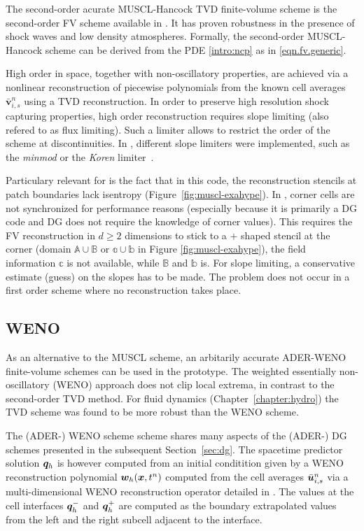 The second-order acurate MUSCL-Hancock TVD finite-volume scheme
\citep{toro-book} is the second-order FV scheme available in
. It has proven robustness in the presence of
shock waves and low density atmospheres. 
Formally, the second-order MUSCL-Hancock scheme can be derived from the PDE
\eqref{intro:ncp} as in \eqref{eqn.fv.generic}.

High order in space, together with non-oscillatory properties, are
achieved  via a {nonlinear} reconstruction of
piecewise polynomials from the known cell averages
$\bar{\boldsymbol{v}}_{i,s}^n$ using a TVD reconstruction. In order to
preserve high resolution shock capturing properties, high order
reconstruction requires slope limiting (also refered to as flux limiting).
Such a limiter allows to restrict the order of the scheme at discontinuities.
In , different slope limiters were implemented, such as the
\emph{minmod} \cite{Roe86} or the \emph{Koren} limiter~\cite{Koren1993}.

Particulary relevant for  is the fact that in this code,
the reconstruction stencils at patch boundaries lack isentropy
(Figure~\ref{fig:muscl-exahype}).
In , corner cells are not synchronized for performance reasons
(especially because it is primarily a DG code and DG does not require
the knowledge of corner values). This requires the FV reconstruction in
$d\geq 2$ dimensions to stick to a $+$ shaped stencil at the corner
(domain $\mathbb A \cup \mathbb B$ or $\mathbb a \cup \mathbb b$ in Figure
\ref{fig:muscl-exahype}), \ie the field information $\mathbb c$ is not
available, while $\mathbb B$ and $\mathbb b$ is.
For slope limiting, a conservative estimate (guess) on the slopes has to be
made.
The problem does not occur in a first order scheme where no
reconstruction takes place.

\subsection{WENO}

As an alternative to the MUSCL scheme, an arbitarily accurate ADER-WENO
finite-volume schemes can be used in the  prototype.
The weighted essentially non-oscillatory (WENO) approach does not clip local
extrema, in contrast to the second-order TVD method. For fluid dynamics
(Chapter~\ref{chapter:hydro}) the TVD scheme was found to be more robust
than the WENO scheme.

The (ADER-) WENO scheme scheme shares many aspects of the (ADER-) DG
schemes presented in the subsequent Section~\ref{sec:dg}. The spacetime
predictor solution $\boldsymbol{q}_h$ is however computed from an initial
conditition given by a WENO reconstruction polynomial $\boldsymbol{w}_h(\boldsymbol{x},t^n)$
computed from the cell averages
$\bar{\boldsymbol{u}}^n_{i,s}$ via a multi-dimensional WENO reconstruction operator
detailed in \cite{Jiang1996,Dumbser2008,Dumbser2013}. The values at the cell
interfaces $\boldsymbol{q}_h^-$ and $\boldsymbol{q}_h^+$ are computed as the boundary
extrapolated values from the left and the right subcell adjacent to the
interface.

